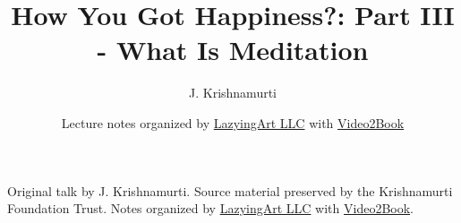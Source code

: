 \documentclass[11pt,oneside]{book}
\begin{document}
\frontmatter
\title{How You Got Happiness?: Part III - What Is Meditation}
\author{J. Krishnamurti}
\date{Lecture notes organized by \href{https://lazying.art}{LazyingArt LLC} with \href{https://github.com/lachlanchen/Video2Book}{Video2Book}}
\maketitle
\begin{center}
\small Original talk by J. Krishnamurti. Source material preserved by the Krishnamurti Foundation Trust. Notes organized by \href{https://lazying.art}{LazyingArt LLC} with \href{https://github.com/lachlanchen/Video2Book}{Video2Book}.
\end{center}
\clearpage
\mainmatter

\end{document}

